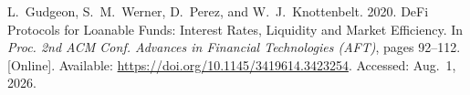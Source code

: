 \documentclass[12pt,a4paper]{report}
\begin{document}
{\begin{enumerate}[label={[\arabic*]}]
\item L.~Gudgeon, S.~M.~Werner, D.~Perez, and W.~J.~Knottenbelt. 2020. DeFi Protocols for Loanable Funds: Interest Rates, Liquidity and Market Efficiency. In \emph{Proc. 2nd ACM Conf. Advances in Financial Technologies (AFT)}, pages 92--112. [Online]. Available: \url{https://doi.org/10.1145/3419614.3423254}. Accessed: Aug.~1, 2026.









\end{enumerate}}
\end{document}
